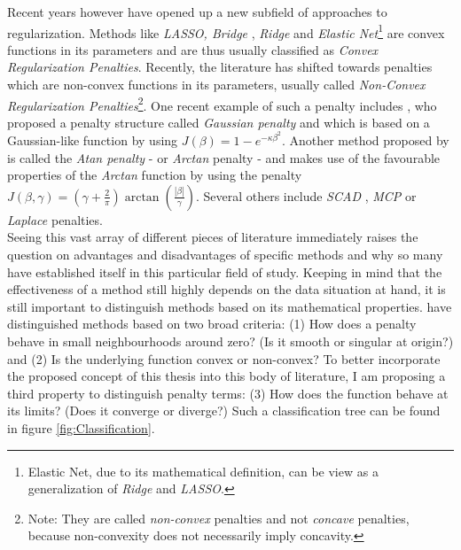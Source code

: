 \documentclass[12pt,a4paper]{article}
\begin{document}
Recent years however have opened up a new subfield of approaches to regularization. Methods like \textit{LASSO, Bridge} \parencite{FrankFriedman1993}, \textit{Ridge} and \textit{Elastic Net}\footnote{Elastic Net, due to its mathematical definition, can be view as a generalization of \textit{Ridge} and \textit{LASSO}.} are convex functions in its parameters and are thus usually classified as \textit{Convex Regularization Penalties}. Recently, the literature has shifted towards penalties which are non-convex functions in its parameters, usually called \textit{Non-Convex Regularization Penalties}\footnote{Note: They are called \textit{non-convex} penalties and not \textit{concave} penalties, because non-convexity does not necessarily imply concavity.}. One recent example of such a penalty includes \textcite{JohnVettamWu2022}, who proposed a penalty structure called \textit{Gaussian penalty} and which is based on a Gaussian-like function by using $J(\beta) = 1 - e^{-\kappa\beta^2}$. Another method proposed by \textcite{WangZhu2016} is called the \textit{Atan penalty} - or \textit{Arctan} penalty - and makes use of the favourable properties of the \textit{Arctan} function by using the penalty $J(\beta, \gamma) = (\gamma + \frac{2}{\pi})\arctan(\frac{|\beta|}{\gamma})$. Several others include \textit{SCAD} \parencite{FanLi2001}, \textit{MCP} \parencite{Zhang2010} or \textit{Laplace} \parencite{TrzaskoManduca2009} penalties.\\

Seeing this vast array of different pieces of literature immediately raises the question on advantages and disadvantages of specific methods and why so many have established itself in this particular field of study. Keeping in mind that the effectiveness of a method still highly depends on the data situation at hand, it is still important to distinguish methods based on its mathematical properties. \textcite{JohnVettamWu2022} have distinguished methods based on two broad criteria: (1) How does a penalty behave in small neighbourhoods around zero? (Is it smooth or singular at origin?) and (2) Is the underlying function convex or non-convex? To better incorporate the proposed concept of this thesis into this body of literature, I am proposing a third property to distinguish penalty terms: (3) How does the function behave at its limits? (Does it converge or diverge?) Such a classification tree can be found in figure \ref{fig:Classification}. \\
\end{document}
